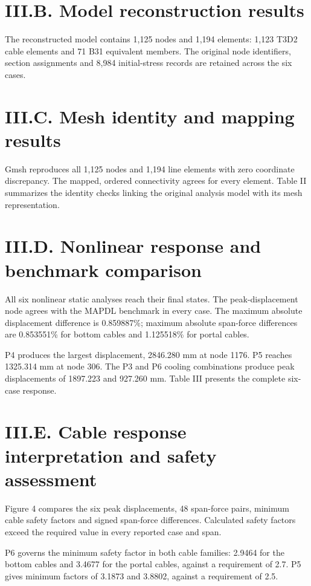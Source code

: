\documentclass[11pt]{article}
\begin{document}
\section*{III.B. Model reconstruction results}
The reconstructed model contains 1,125 nodes and 1,194 elements: 1,123 T3D2 cable elements and 71 B31 equivalent members. The original node identifiers, section assignments and 8,984 initial-stress records are retained across the six cases.

\section*{III.C. Mesh identity and mapping results}
Gmsh reproduces all 1,125 nodes and 1,194 line elements with zero coordinate discrepancy. The mapped, ordered connectivity agrees for every element. Table II summarizes the identity checks linking the original analysis model with its mesh representation.

\section*{III.D. Nonlinear response and benchmark comparison}
All six nonlinear static analyses reach their final states. The peak-displacement node agrees with the MAPDL benchmark in every case. The maximum absolute displacement difference is 0.859887\%; maximum absolute span-force differences are 0.853551\% for bottom cables and 1.125518\% for portal cables.

P4 produces the largest displacement, 2846.280 mm at node 1176. P5 reaches 1325.314 mm at node 306. The P3 and P6 cooling combinations produce peak displacements of 1897.223 and 927.260 mm. Table III presents the complete six-case response.

\section*{III.E. Cable response interpretation and safety assessment}
Figure 4 compares the six peak displacements, 48 span-force pairs, minimum cable safety factors and signed span-force differences. Calculated safety factors exceed the required value in every reported case and span.

P6 governs the minimum safety factor in both cable families: 2.9464 for the bottom cables and 3.4677 for the portal cables, against a requirement of 2.7. P5 gives minimum factors of 3.1873 and 3.8802, against a requirement of 2.5.
\end{document}
